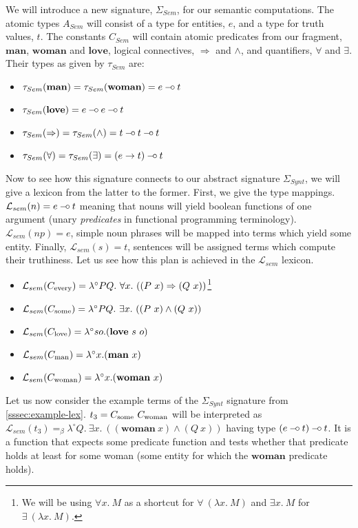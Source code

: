 We will introduce a new signature, $\Sigma_{Sem}$, for our semantic
computations. The atomic types $A_{Sem}$ will consist of a type for
entities, $e$, and a type for truth values, $t$. The constants $C_{Sem}$
will contain atomic predicates from our fragment, $\textbf{man}$,
$\textbf{woman}$ and $\textbf{love}$, logical connectives, $\Rightarrow$
and $\land$, and quantifiers, $\forall$ and $\exists$. Their types as
given by $\tau_{Sem}$ are:
\begin{itemize}
\item $\tau_{Sem}(\textbf{man}) = \tau_{Sem}(\textbf{woman}) = e \mathbin{{-}\mkern-3.5mu{\circ}}
  t$
\item $\tau_{Sem}(\textbf{love}) = e \mathbin{{-}\mkern-3.5mu{\circ}} e \mathbin{{-}\mkern-3.5mu{\circ}} t$
\item $\tau_{Sem}(\Rightarrow) = \tau_{Sem}(\land) = t \mathbin{{-}\mkern-3.5mu{\circ}} t \mathbin{{-}\mkern-3.5mu{\circ}} t$
\item $\tau_{Sem}(\forall) = \tau_{Sem}(\exists) = (e \to t) \mathbin{{-}\mkern-3.5mu{\circ}} t$
\end{itemize}

Now to see how this signature connects to our abstract signature
$\Sigma_{Synt}$, we will give a lexicon from the latter to the
former. First, we give the type mappings. $\mathcal{L}_{sem}(n) = e
\mathbin{{-}\mkern-3.5mu{\circ}} t$ meaning that nouns will yield boolean functions of one argument
(unary \emph{predicates} in functional programming
terminology). $\mathcal{L}_{sem}(np) = e$, simple noun phrases will be
mapped into terms which yield some entity. Finally,
$\mathcal{L}_{sem}(s) = t$, sentences will be assigned terms which
compute their truthiness. Let us see how this plan is achieved in the
$\mathcal{L}_{sem}$ lexicon.
\begin{itemize}
\item $\mathcal{L}_{sem}(C_{\textrm{every}}) = \lambda^{\circ} P Q.\ \forall
  x.\ ((P\ x) \Rightarrow (Q\ x))$\footnote{We will be using $\forall
    x.\ M$ as a shortcut for $\forall\ (\lambda x.\ M)$ and $\exists
    x.\ M$ for $\exists\ (\lambda x.\ M)$.}
\item $\mathcal{L}_{sem}(C_{\textrm{some}}) = \lambda^{\circ} P Q.\ \exists
  x.\ ((P\ x) \land (Q\ x))$
\item $\mathcal{L}_{sem}(C_{\textrm{love}}) = \lambda^{\circ} s o. (\textbf{love}\ s\ o)$
\item $\mathcal{L}_{sem}(C_{\textrm{man}}) = \lambda^{\circ} x. (\textbf{man}\ x)$
\item $\mathcal{L}_{sem}(C_{\textrm{woman}}) = \lambda^{\circ} x. (\textbf{woman}\ x)$
\end{itemize}

Let us now consider the example terms of the $\Sigma_{Synt}$ signature
from \ref{sssec:example-lex}. $t_3 = C_{\textrm{some}}\ C_{\textrm{woman}}$ will be
interpreted as $\mathcal{L}_{sem}(t_3) =_{\beta} \lambda^{\circ}
Q.\ \exists x.\ ((\textbf{woman}\ x) \land (Q\ x))$ having type $(e \mathbin{{-}\mkern-3.5mu{\circ}}
t) \mathbin{{-}\mkern-3.5mu{\circ}} t$. It is a function that expects some predicate function and
tests whether that predicate holds at least for some woman (some entity
for which the $\textbf{woman}$ predicate holds).

